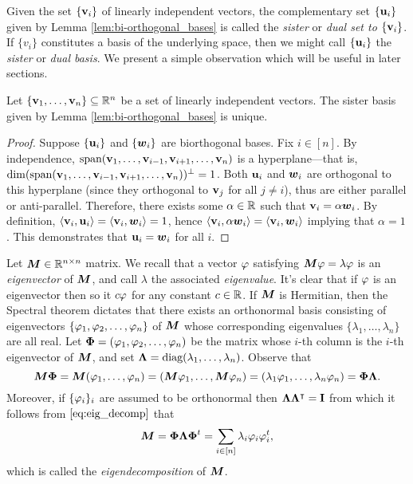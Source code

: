 Given the set $\{\vb{v}_i\}$ of linearly independent vectors, the complementary set $\{\vb{u}_i\}$ given by Lemma \ref{lem:bi-orthogonal_bases} is called the \emph{sister} or \emph{dual set to $\{\vb{v}_i\}$}. If $\{v_i\}$ constitutes a basis of the underlying space, then we might call $\{\vb{u}_i\}$ the \emph{sister} or \emph{dual basis}.  We present a simple observation which will be useful in later sections. 

\begin{observation}
\label{obs:bi-orthogonal_unique}
Let $\{\vb{v}_1,\dots,\vb{v}_n\}\subseteq\mathbb{R}^n$ be a set of linearly independent vectors. The sister basis given by Lemma \ref{lem:bi-orthogonal_bases} is unique. 
\end{observation}
\begin{proof}
Suppose $\{\vb{u}_i\}$ and $\{\vb*{w}_i\}$ are biorthogonal bases. Fix $i\in[n]$. By independence, $\textnormal{span}(\vb{v}_1,\dots,\vb{v}_{i-1},\vb{v}_{i+1},\dots,\vb{v}_n)$ is a hyperplane---that is, $\dim(\textnormal{span}(\vb{v}_1,\dots,\vb{v}_{i-1},\vb{v}_{i+1},\dots,\vb{v}_n))^\perp=1$. Both $\vb{u}_i$ and $\vb*{w}_i$ are orthogonal to this hyperplane (since they orthogonal to $\vb{v}_j$ for all $j\neq i$), thus are either parallel or anti-parallel. Therefore, there exists some $\alpha\in\mathbb{R}$ such that $\vb{v}_i=\alpha\vb*{w}_i$. By definition, $\langle \vb{v}_i,\vb{u}_i\rangle = \langle \vb{v}_i,\vb*{w}_i\rangle =1$, hence $\langle \vb{v}_i,\alpha \vb*{w}_i\rangle = \langle \vb{v}_i,\vb*{w}_i\rangle$ implying that $\alpha=1$. This demonstrates that $\vb{u}_i=\vb*{w}_i$ for all $i$. 
\end{proof}

Let ${\vb*{M}}\in\mathbb{R}^{n\times n}$ matrix. We recall that a vector $\varphi$ satisfying ${\vb*{M}}\varphi=\lambda\varphi$ is an \emph{eigenvector} of ${\vb*{M}}$, and call $\lambda$ the associated \emph{eigenvalue}. It's clear that if $\varphi$ is an eigenvector then so it $c\varphi$ for any constant $c\in \mathbb{R}$. If ${\vb*{M}}$ is Hermitian, then the Spectral theorem dictates that there exists an orthonormal basis consisting of eigenvectors $\{\varphi_1,\varphi_2,\dots,\varphi_n\}$ of ${\vb*{M}}$ whose corresponding eigenvalues $\{\lambda_1,\dots,\lambda_n\}$ are all real. Let $\boldsymbol{\Phi}=(\varphi_1,\varphi_2,\dots,\varphi_n)$ be the matrix whose $i$-th column is the $i$-th eigenvector of ${\vb*{M}}$, and set $\vb{\Lambda}=\text{diag}(\lambda_1,\dots,\lambda_n)$. Observe that 
\begin{equation}
\label{eq:eig_decomp}
{\vb*{M}}\boldsymbol{\Phi}={\vb*{M}}(\varphi_1,\dots,\varphi_n)=({\vb*{M}}\varphi_1,\dots,{\vb*{M}}\varphi_n)=(\lambda_1\varphi_1,\dots,\lambda_n\varphi_n)=\boldsymbol{\Phi}\vb{\Lambda}.
\end{equation}
Moreover, if $\{\varphi_i\}_i$ are assumed to be orthonormal then $\vb{\Lambda}\vb{\Lambda}^\intercal=\vb{I}$ from which it follows from $\eqref{eq:eig_decomp}$ that \begin{equation}
    \label{eq:eig_decomp2}
    {\vb*{M}}=\boldsymbol{\Phi}\vb{\Lambda}\boldsymbol{\Phi}^t = \sum_{i\in[n]}\lambda_i\varphi_i\varphi_i^t,
\end{equation}
which is called the \emph{eigendecomposition} of ${\vb*{M}}$. 

